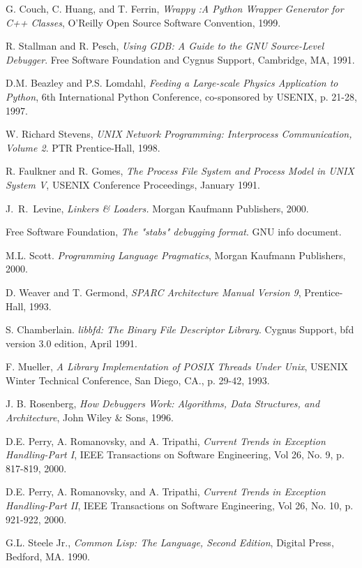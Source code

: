 \begin{thebibliography}{99}
 G. Couch, C. Huang, and T. Ferrin, {\em Wrappy :A Python Wrapper
Generator for C++ Classes}, O'Reilly Open Source Software Convention, 1999.

 R. Stallman and R. Pesch, {\em Using GDB: A Guide to the GNU Source-Level Debugger}.
Free Software Foundation and Cygnus Support, Cambridge, MA, 1991.

 D.M. Beazley and P.S. Lomdahl, {\em Feeding a
Large-scale Physics Application to Python}, 6th International Python
Conference, co-sponsored by USENIX, p. 21-28, 1997.

 W. Richard Stevens, {\em UNIX Network Programming: Interprocess Communication, Volume 2}. PTR
Prentice-Hall, 1998. 

 R. Faulkner and R. Gomes, {\em The Process File System and Process Model in UNIX System V}, USENIX Conference Proceedings,
January 1991. 

 J.~R.~Levine, {\em Linkers \& Loaders.} Morgan Kaufmann Publishers, 2000.

 Free Software Foundation, {\em The "stabs" debugging format}. GNU info document.

 M.L. Scott. {\em Programming Language Pragmatics}, Morgan Kaufmann Publishers, 2000.

 D. Weaver and T. Germond, {\em SPARC Architecture Manual Version 9},
Prentice-Hall, 1993.

 S. Chamberlain. {\em libbfd: The Binary File Descriptor Library}. Cygnus Support, bfd version 3.0 edition, April 1991. 

 F. Mueller, {\em A Library Implementation of POSIX Threads Under Unix},
USENIX Winter Technical Conference, San Diego, CA., p. 29-42, 1993.

 J. B. Rosenberg, {\em How Debuggers Work: Algorithms, Data Structures, and
Architecture}, John Wiley \& Sons, 1996.

 D.E. Perry, A. Romanovsky, and A. Tripathi, {\em
Current Trends in Exception Handling-Part I},
IEEE Transactions on Software Engineering, Vol 26, No. 9, p. 817-819, 2000.

 D.E. Perry, A. Romanovsky, and A. Tripathi, {\em
Current Trends in Exception Handling-Part II},
IEEE Transactions on Software Engineering, Vol 26, No. 10, p. 921-922, 2000.


 G.L. Steele Jr., {\em Common Lisp: The Language, Second Edition}, Digital Press,
Bedford, MA. 1990.


\end{thebibliography}
